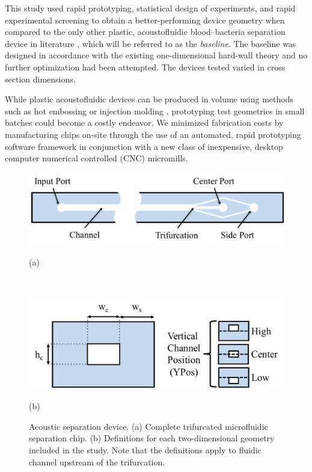This study used rapid prototyping, statistical design of experiments, and rapid experimental screening to obtain a better-performing device geometry when compared to the only other plastic, acoustofluidic blood--bacteria separation device in literature \cite{mueller2013continuous}, which will be referred to as the \textit{baseline}. The baseline was designed in accordance with the existing one-dimensional hard-wall theory and no further optimization had been attempted. The devices tested varied in cross section dimensions. 

While plastic acoustofluidic devices can be produced in volume using methods such as hot embossing or injection molding \cite{heckele2003review}, prototyping test geometries in small batches could become a costly endeavor.  We minimized fabrication costs by manufacturing chips on-site through the use of an automated, rapid prototyping software framework in conjunction with a new class of inexpensive, desktop computer numerical controlled (CNC) micromills.


\begin{figure}[htb]
  \begin{minipage}[t]{0.99\linewidth}\centering
    \includegraphics[width=14cm]{chip}
    \medskip
    \centerline{(a)}
  \end{minipage}\hfill\\
  \begin{minipage}[t]{0.99\linewidth}\centering
    \includegraphics[width=14cm]{2D}
    \medskip
    \centerline{(b)}
  \end{minipage}
  \caption[Acoustofluidic separation device and 2D geometric definitions]{Acoustic separation device. (a) Complete trifurcated microfluidic separation chip. (b) Definitions for each two-dimensional geometry included in the study. Note that the definitions apply to fluidic channel upstream of the trifurcation.} 
  \label{fig:geometry}
\end{figure}

